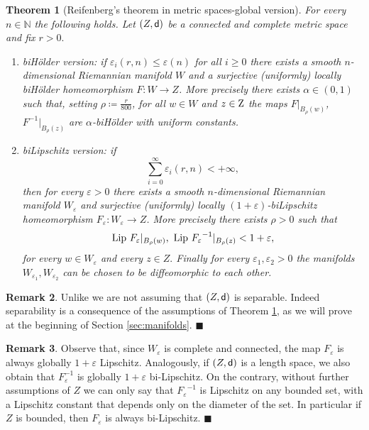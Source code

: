 \documentclass[11pt]{article}
\newcommand{\eps}{\varepsilon}
\newcommand{\sfd}{{\sf d}}
\newcommand{\Lip}{{\rm Lip}}
\newcommand{\fr}{\penalty-20\null\hfill$\blacksquare$}
\newcommand{\Z}{{\rm Z}}
\theoremstyle{plain}
\newtheorem{theorem}{Theorem}[section]
\theoremstyle{definition}
\newtheorem{remark}[theorem]{Remark}
\numberwithin{equation}{section}
\begin{document}
\begin{theorem}[Reifenberg's theorem in metric spaces-global version]\label{mainthm}
	For every  $n \in \mathbb{N}$ the following holds.  Let $(Z,\sfd)$ be a connected and complete metric space and fix $r>0.$
\begin{enumerate}[label=\roman*)]
    \item \emph{biH\"older version:} if $\eps_i(r,n)\le \eps(n)$ for all $i\ge 0$ there exists  a smooth $n$-dimensional Riemannian manifold $W$ and a surjective (uniformly) locally  biH\"older homeomorphism $F: W \to Z $. More precisely there exists $\alpha\in (0,1)$ such that, setting $\rho\coloneqq \frac{r}{800}$, for all $w \in W$ and $z\in \Z$ the maps $F|_{B_\rho(w)}$,  $F^{-1}|_{B_{\rho}(z)}$ are $\alpha$-biH\"older with uniform constants.
    \item  \emph{biLipschitz version:}	if \begin{equation}\label{sumscales}
		\sum_{i=0}^\infty \eps_{i}(r,n) < +\infty,
	\end{equation}
	then for every $\eps>0$ there exists  a smooth $n$-dimensional Riemannian manifold $W_\eps$ and surjective (uniformly) locally  $(1+\eps)$-biLipschitz homeomorphism $F_{\eps}: W_{\eps} \to Z $. More precisely there exists $\rho>0$ such that 
	\begin{equation}\label{finalbilip}
		\Lip\ F_{\eps}|_{B_{\rho}(w)}, \,\, \Lip\ {F_{\eps}}^{-1}|_{B_{\rho}(z)} <1+\eps,
	\end{equation}
	for every $w \in W_{\eps}$ and every $z \in Z.$ 
 Finally for every $\eps_1,\eps_2>0$  the manifolds $W_{\eps_1},W_{\eps_2}$ can be chosen to be diffeomorphic to each other. 
\end{enumerate} 

\end{theorem}

\begin{remark}
	Unlike \cite{Cheegercolding} we are not assuming that $(Z,\sfd)$ is separable. Indeed separability is a consequence of the assumptions of Theorem \ref{mainthm}, as we will prove at the beginning of Section \ref{sec:manifolds}. \fr
\end{remark}


\begin{remark}
	Observe that, since $W_{\eps}$ is complete and connected, the map $F_{\eps}$ is always globally $1+\eps$ Lipschitz. Analogously, if $(Z,\sfd)$ is a length space, we also obtain that $F_{\eps}^{-1}$ is globally $1+\eps$ bi-Lipschitz. On the contrary, without further assumptions of $Z$ we can only say that ${F_{\eps}}^{-1}$ is Lipschitz on any bounded set, with a Lipschitz constant that depends only on the diameter of the set. In particular if $Z$ is bounded, then $F_{\eps}$ is always bi-Lipschitz. \fr
\end{remark}
\end{document}
